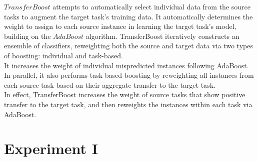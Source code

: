 \documentclass[a4paper,12pt, english]{article}
\begin{document}
$TransferBoost$ attempts to automatically select individual data from the source tasks to augment the target task’s training data. It automatically determines the weight to assign to each source instance in learning the target task's model, building on the $AdaBoost$ algorithm. TransferBoost iteratively constructs an ensemble of classifiers, reweighting both the source and target data via two types of boosting: individual and task-based.\\
It increases the weight of individual mispredicted instances following AdaBoost. In parallel, it also performs task-based boosting by reweighting all instances from each source task based on their aggregate transfer to the target task.\\

In effect, TransferBoost increases the weight of source tasks that show positive transfer to the target task, and then reweights the instances within each task via AdaBoost. 

\section{Experiment I}
\end{document}
